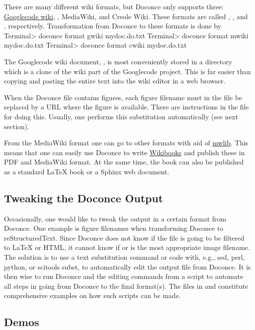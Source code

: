 \documentclass{book}
\begin{document}
There are many different wiki formats, but Doconce only supports three:
\href{{http://code.google.com/p/support/wiki/WikiSyntax<Google Code>}}{Googlecode wiki}, , MediaWiki, and Creole Wiki. These formats are called
, , and , respectively.
Transformation from Doconce to these formats is done by
\bsys
Terminal> doconce format gwiki mydoc.do.txt
Terminal> doconce format mwiki mydoc.do.txt
Terminal> doconce format cwiki mydoc.do.txt
\esys

The Googlecode wiki document, , is most conveniently stored
in a directory which is a clone of the wiki part of the Googlecode project.
This is far easier than copying and pasting the entire text into the
wiki editor in a web browser.

When the Doconce file contains figures, each figure filename must in
the  file be replaced by a URL where the figure is
available. There are instructions in the file for doing this. Usually,
one performs this substitution automatically (see next section).

From the MediaWiki format one can go to other formats with aid
of \href{{http://pediapress.com/code/}}{mwlib}. This means that one can
easily use Doconce to write \href{{http://en.wikibooks.org}}{Wikibooks}
and publish these in PDF and MediaWiki format.
At the same time, the book can also be published as a
standard {\LaTeX} book or a Sphinx web document.

\subsection{Tweaking the Doconce Output}

Occasionally, one would like to tweak the output in a certain format
from Doconce. One example is figure filenames when transforming
Doconce to reStructuredText. Since Doconce does not know if the
 file is going to be filtered to {\LaTeX} or HTML, it cannot know
if  or  is the most appropriate image filename.
The solution is to use a text substitution command or code with, e.g., sed,
perl, python, or scitools subst, to automatically edit the output file
from Doconce. It is then wise to run Doconce and the editing commands
from a script to automate all steps in going from Doconce to the final
format(s). The  files in  and 
constitute comprehensive examples on how such scripts can be made.

\subsection{Demos}
\end{document}
